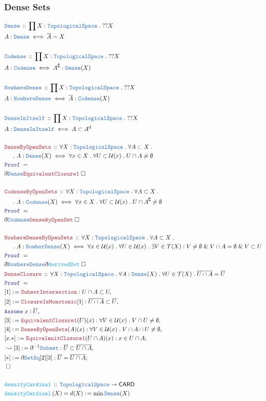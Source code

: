 \documentclass[12pt]{scrartcl}
\newcommand{\TYPE}[1]{\textcolor{NavyBlue}{\mathtt{#1}}}
\newcommand{\FUNC}[1]{\textcolor{Cerulean}{\mathtt{#1}}}
\newcommand{\LOGIC}[1]{\textcolor{Blue}{\mathtt{#1}}}
\newcommand{\THM}[1]{\textcolor{Maroon}{\mathtt{#1}}}
\renewcommand{\.}{\; . \;}
\newcommand{\de}{: \kern 0.1pc =}
\newcommand{\Act}[1]{\left( #1 \right)}
\newcommand{\Theorem}[2]{& \THM{#1} \, :: \, #2 \\ & \Proof = \\ }
\newcommand{\DeclareType}[2]{& \TYPE{#1} \, :: \, #2 \\}
\newcommand{\DefineType}[3]{& #1 : \TYPE{#2} \iff #3 \\}
\newcommand{\DeclareFunc}[2]{& \FUNC{#1} \, :: \, #2 \\}
\newcommand{\DefineNamedFunc}[4]{&  \FUNC{#1}\Act{#2} = #3 \de #4 \\}
\newcommand{\NewLine}{\\ & \kern 1pc}
\newcommand{\Page}[1]{ \begin{align*} #1 \end{align*}   }
\newcommand{ \bd }{ \ByDef }
\renewcommand{\And}{\; \& \;}
\renewcommand{\c}{\complement}
\newcommand{\Say}[3]{& #1 \de #2 : #3, \\}
\newcommand{\Conclude}[3]{& #1 \de #2 : #3; \\}
\newcommand{\Derive}[3]{& \leadsto #1 \de #2 : #3, \\}
\newcommand{\Assume}[2]{& \LOGIC{Assume} \; #1 : #2, \\}
\newcommand{\QED}{\; \square}
\newcommand{\EndProof}{& \QED \\}
\newcommand{\ByDef}{\eth}
\newcommand{\Proof}{\LOGIC{Proof} \; }
\newcommand{\TS}{\TYPE{TopologicalSpace}}
\newcommand{\T}{\mathcal{T}}
\newcommand{\U}{\mathcal{U}}
\renewcommand{\d}{\mathrm{d}}
\begin{document}
\subsubsection{Dense Sets}
\Page{
	\DeclareType{Dense}{\prod X : \TS \. ??X}
	\DefineType{A}{Dense}{\overline{A} = X}
	\\
	\DeclareType{Codense}{\prod X : \TS \. ??X}
	\DefineType{A}{Codense}{A^\c : \TYPE{Dense}(X)}
	\\
	\DeclareType{NowhereDense}{\prod X : \TS \. ??X}
	\DefineType{A}{NowhereDense}{\overline{A} : \TYPE{Codense}(X)} 
	\\
	\DeclareType{DenseInItself}{\prod X : \TS \. ??X}
	\DefineType{A}{DenseInItself}{A \subset A^\d}
	\\
	\Theorem{DenseByOpenSets}
	{
		\forall X : \TS \. 
		\forall A \subset X \. \NewLine \. 
		A : \TYPE{Dense}(X) \iff \forall x \in X \. \forall U \subset \U(x) \. U \cap A \neq \emptyset
	}
	&  \bd \TYPE{Dense} \THM{EquivalentClosure1} \QED
	\\ \\
	\Theorem{CodenseByOpenSets}
	{
		\forall X : \TS \. 
		\forall A \subset X \. \NewLine \. 
		A : \TYPE{Codense}(X) \iff \forall x \in X \. \forall U \subset \U(x) 
		\. U \cap A^\c \neq \emptyset
	}
	&  \bd \TYPE{Codense} \THM{DenseByOpenSet} \QED
	\\ \\
	\Theorem{NowhereDenseByOpenSets}
	{
		\forall X : \TS \. 
		\forall A \subset X \. \NewLine \. 
		A : \TYPE{NowherDense}(X) \iff \forall x \in \U(x) \. 
		\forall U \in \U(x) \. 
		\exists V \in \T(X) :
		V \neq \emptyset \And V \cap A = \emptyset \And V \subset U
	}
	&  \bd \TYPE{NowhereDense} \bd \FUNC{derivedSet} \QED
	\\
	\Theorem{DenseClosure}
	{
		\forall X : \TS \.
		\forall A : \TYPE{Dense}(X) \.
		\forall U \in \T(X) \. 
		\overline{U \cap A} =  \overline{U}
	}
	\Say{[1]}{\THM{SubsetIntersection}}{U  \cap A \subset U}
	\Say{[2]}{\THM{ClosureIsMonotonic}[1]}{ \overline{U \cap A} \subset \overline{U}}
	\Assume{x}{\overline{U}}
	\Say{[3]}{\THM{EquivalentClosure1}(U)(x)}
	{\forall V \in \U(x) \. V \cap U \neq \emptyset }
	\Say{[4]}{\THM{DenseByOpenSets}(A)(x) }
	{\forall V \in \U(x) \. V \cap A \cap U \neq \emptyset }
	\Conclude{[x.*]}{\THM{EquivalenitClosure1}(U \cap A)(x)}
	{
		x \in U \cap A
	}
	\Derive{[3]}{\bd^{-1} \TYPE{Subset}}
	{
		\overline{U} \subset \overline{U \cap A}
	}
	\Conclude{[*]}{\bd \TYPE{SetEq}[2][3]}
	{
		\overline{U} = \overline{U \cap A}
	}
	\EndProof
	\\
	\DeclareFunc{densityCardinal}
	{
		\TS \to \mathsf{CARD} 
	}
	\DefineNamedFunc{densityCardinal}
	{X}{d(X)}{\min \TYPE{Dense}(X)}
}
\end{document}
